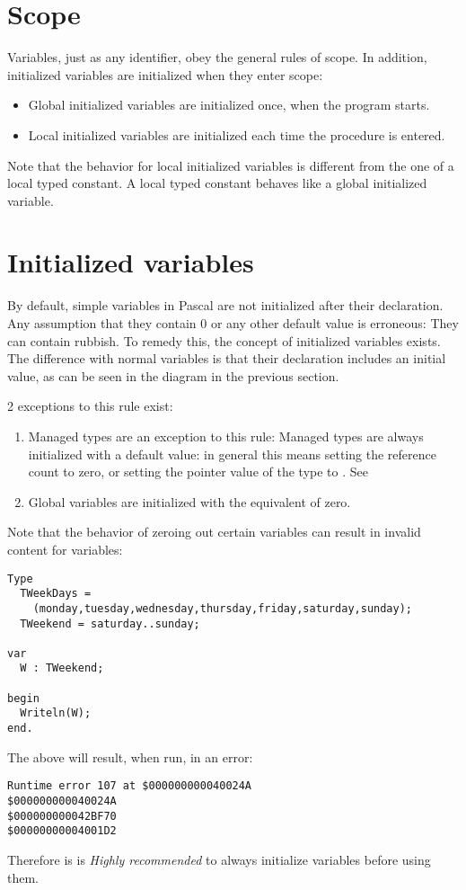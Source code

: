 \section{Scope}
Variables, just as any identifier, obey the general rules of scope.
In addition, initialized variables are initialized when they enter scope:
\begin{itemize}
\item Global initialized variables are initialized once, when the program starts.
\item Local initialized variables are initialized each time the procedure is
entered.
\end{itemize}
Note that the behavior for local initialized variables is different from
the one of a local typed constant. A local typed constant behaves like a
global initialized variable.

\section{Initialized variables}
\label{se:initializedvars}
By default, simple variables in Pascal are not initialized after their declaration.
Any assumption that they contain 0 or any other default value is erroneous:
They can contain rubbish. To remedy this, the concept of initialized variables
exists. The difference with normal variables is that their declaration includes
an initial value, as can be seen in the diagram in the previous section.

\begin{remark}
2 exceptions to this rule exist:
\begin{enumerate}
\item Managed types are an exception to this rule: Managed types are always
initialized with a default value: in general this means setting the reference
count to zero, or setting the pointer value of the type to .
See 
\item Global variables are initialized with the equivalent of zero.
\end{enumerate}
\end{remark}

Note that the behavior of zeroing out certain variables can result in invalid
content for variables:
\begin{verbatim}
Type
  TWeekDays =
    (monday,tuesday,wednesday,thursday,friday,saturday,sunday);
  TWeekend = saturday..sunday;

var
  W : TWeekend;

begin
  Writeln(W);
end.
\end{verbatim}
The above will result, when run, in an error:
\begin{verbatim}
Runtime error 107 at $000000000040024A
$000000000040024A
$000000000042BF70
$00000000004001D2
\end{verbatim}
Therefore is is {\em Highly recommended} to always initialize variables
before using them.

